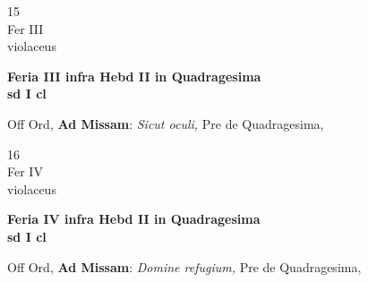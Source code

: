 \documentclass[10pt, openany]{book}
\begin{document}
        \begin{center}
            \begin{minipage}{3.5in}
                \vspace{2em}
                \begin{minipage}{0.5in}
                    {\Huge 15} \\
                    {\normalsize Fer III} \\
                    {\normalsize violaceus}
                \end{minipage}
                \begin{minipage}{3.0in}
                    \textbf{ \large Feria III infra Hebd II in Quadragesima \\
                    \textnormal{\normalsize sd I cl}} \\ 
                \end{minipage}
                \begin{justify}Off Ord, \textbf{Ad Missam}: \textit{Sicut oculi,} Pre de Quadragesima,  
                \end{justify}
            \end{minipage}
        \end{center}
    
        \begin{center}
            \begin{minipage}{3.5in}
                \vspace{2em}
                \begin{minipage}{0.5in}
                    {\Huge 16} \\
                    {\normalsize Fer IV} \\
                    {\normalsize violaceus}
                \end{minipage}
                \begin{minipage}{3.0in}
                    \textbf{ \large Feria IV infra Hebd II in Quadragesima \\
                    \textnormal{\normalsize sd I cl}} \\ 
                \end{minipage}
                \begin{justify}Off Ord, \textbf{Ad Missam}: \textit{Domine refugium,} Pre de Quadragesima,  
                \end{justify}
            \end{minipage}
        \end{center}
    
\end{document}
